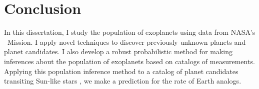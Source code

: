 \chapter*{Conclusion}

In this dissertation, I study the population of exoplanets using data from
NASA's \kepler\ Mission.
I apply novel techniques to discover previously unknown planets and planet
candidates.
I also develop a robust probabilistic method for making inferences about the
population of exoplanets based on catalogs of measurements.
Applying this population inference method to a catalog of planet candidates
transiting Sun-like stars \citep{Petigura:2013}, we make a prediction for the
rate of Earth analogs.
